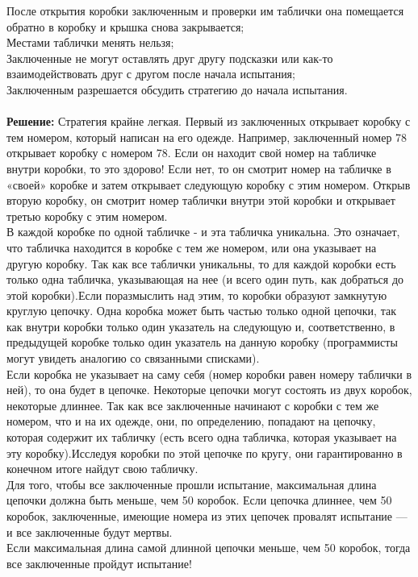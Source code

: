 \documentclass[12pt, oneside]{book}
\theoremstyle{definition}
\begin{document}
\begin{enumerate}
После открытия коробки заключенным и проверки им таблички она помещается обратно в коробку и крышка снова закрывается;\\
Местами таблички менять нельзя;\\
Заключенные не могут оставлять друг другу подсказки или как-то взаимодействовать друг с другом после начала испытания;\\
Заключенным разрешается обсудить стратегию до начала испытания.\\
\\
\textbf{Решение:} Стратегия крайне легкая. Первый из заключенных открывает коробку с тем номером, который написан на его одежде. Например, заключенный номер 78 открывает коробку с номером 78. Если он находит свой номер на табличке внутри коробки, то это здорово! Если нет, то он смотрит номер на табличке в «своей» коробке и затем открывает следующую коробку с этим номером. Открыв вторую коробку, он смотрит номер таблички внутри этой коробки и открывает третью коробку с этим номером.\\
В каждой коробке по одной табличке - и эта табличка уникальна. Это означает, что табличка находится в коробке с тем же номером, или она указывает на другую коробку. Так как все таблички уникальны, то для каждой коробки есть только одна табличка, указывающая на нее (и всего один путь, как добраться до этой коробки).Если поразмыслить над этим, то коробки образуют замкнутую круглую цепочку. Одна коробка может быть частью только одной цепочки, так как внутри коробки только один указатель на следующую и, соответственно, в предыдущей коробке только один указатель на данную коробку (программисты могут увидеть аналогию со связанными списками).\\
Если коробка не указывает на саму себя (номер коробки равен номеру таблички в ней), то она будет в цепочке. Некоторые цепочки могут состоять из двух коробок, некоторые длиннее. Так как все заключенные начинают с коробки с тем же номером, что и на их одежде, они, по определению, попадают на цепочку, которая содержит их табличку (есть всего одна табличка, которая указывает на эту коробку).Исследуя коробки по этой цепочке по кругу, они гарантированно в конечном итоге найдут свою табличку.\\
Для того, чтобы все заключенные прошли испытание, максимальная длина цепочки должна быть меньше, чем 50 коробок. Если цепочка длиннее, чем 50 коробок, заключенные, имеющие номера из этих цепочек провалят испытание — и все заключенные будут мертвы.\\
Если максимальная длина самой длинной цепочки меньше, чем 50 коробок, тогда все заключенные пройдут испытание!\\

\end{enumerate}
\end{document}

